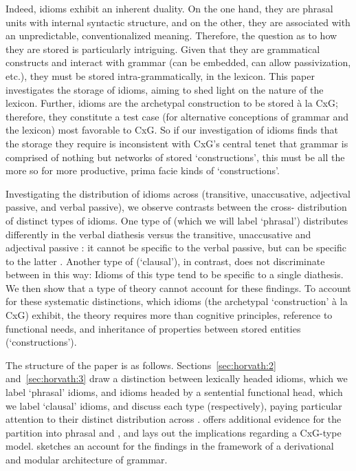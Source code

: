 \documentclass[output=paper,
modfonts
]{LSP/langsci}
\begin{document}
Indeed, idioms exhibit an inherent duality. On the one hand, they are
phrasal units with internal syntactic structure, and on the other, they
are associated with an unpredictable, conventionalized meaning.
Therefore, the question as to how they are stored is particularly
intriguing. Given that they are grammatical constructs and interact with
grammar (can be embedded, can allow passivization, etc.), they must be
stored intra-grammatically, in the lexicon. This paper investigates the
storage of idioms, aiming to shed light on the nature of the lexicon.
Further, idioms are the archetypal construction to be stored à la CxG;
therefore, they constitute a test case (for alternative conceptions of
grammar and the lexicon) most favorable to CxG. So if our investigation
of idioms finds that the storage they require is inconsistent with CxG's
central tenet that grammar is comprised of nothing but networks of
stored `constructions', this must be all the more so for more
productive, prima facie  kinds of `constructions'.

\largerpage
Investigating the distribution of idioms across  (transitive,
unaccusative, adjectival passive, and verbal passive), we observe
contrasts between the cross- distribution of distinct types of
idioms. One type of  (which we will label `phrasal') distributes
differently in the verbal  diathesis versus the transitive,
unaccusative and adjectival passive : it cannot be specific to
the verbal passive, but can be specific to the latter . Another
type of  (`clausal'), in contrast, does not discriminate between
 in this way: Idioms of this type tend to be specific to a
single diathesis. We then show that a  type of theory
cannot account for these findings. To account for these systematic
distinctions, which idioms (the archetypal `construction' à la CxG)
exhibit, the theory requires more than cognitive principles, reference to functional 
needs, and inheritance of properties between stored entities
(`constructions').

The structure of the paper is as follows. Sections~\ref{sec:horvath:2} and~\ref{sec:horvath:3} draw a
distinction between lexically headed idioms, which we label `phrasal'
idioms, and idioms headed by a sentential functional head, which we
label `clausal' idioms, and discuss each type (respectively), paying
particular attention to their distinct distribution across .
 offers additional evidence for the partition into phrasal and
, and lays out the implications regarding a CxG-type
model.  sketches an account for the findings in the framework
of a derivational and modular architecture of grammar.
\end{document}
